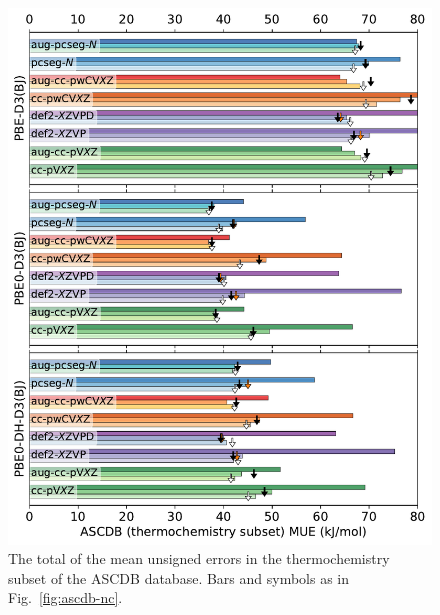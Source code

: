 \documentclass[12pt]{article}
\begin{document}
\begin{figure}[p]
    \centering
    \includegraphics[width=12cm]{../output/fig_ascdb_th.pdf}
    \caption{The total of the mean unsigned errors in the thermochemistry subset of the ASCDB database. Bars and symbols as in Fig.~\ref{fig:ascdb-nc}.}
\end{figure}
\end{document}
